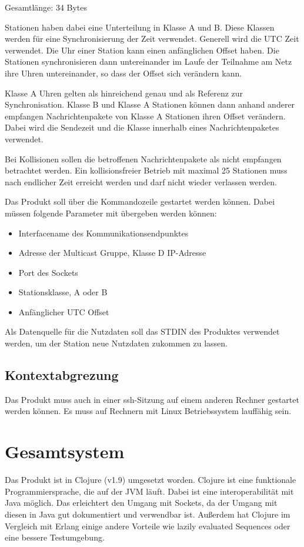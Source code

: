 \documentclass[draft=false
              ,paper=a4
              ,twoside=false
              ,fontsize=11pt
              ,headsepline
              ,BCOR10mm
              ,DIV11
              ]{scrbook}
\begin{document}
Gesamtlänge: 34 Bytes

Stationen haben dabei eine Unterteilung in Klasse A und B. Diese Klassen werden für eine Synchronisierung der Zeit verwendet. Generell wird die UTC Zeit verwendet. Die Uhr einer Station kann einen anfänglichen Offset haben. Die Stationen synchronisieren dann untereinander im Laufe der Teilnahme am Netz ihre Uhren untereinander, so dass der Offset sich verändern kann.

Klasse A Uhren gelten als hinreichend genau und als Referenz zur Synchronisation. Klasse B und Klasse A Stationen können dann anhand anderer empfangen Nachrichtenpakete von Klasse A Stationen ihren Offset verändern. Dabei wird die Sendezeit und die Klasse innerhalb eines Nachrichtenpaketes verwendet.

Bei Kollisionen sollen die betroffenen Nachrichtenpakete als nicht empfangen betrachtet werden. Ein kollisionsfreier Betrieb mit maximal 25 Stationen muss nach endlicher Zeit erreicht werden und darf nicht wieder verlassen werden.

Das Produkt soll über die Kommandozeile gestartet werden können. Dabei müssen folgende Parameter mit übergeben werden können:
\begin{itemize}
	\item Interfacename des Kommunikationsendpunktes
	\item Adresse der Multicast Gruppe, Klasse D IP-Adresse
	\item Port des Sockets
	\item Stationsklasse, A oder B
	\item Anfänglicher UTC Offset
\end{itemize}
Als Datenquelle für die Nutzdaten soll das STDIN des Produktes verwendet werden, um der Station neue Nutzdaten zukommen zu lassen.

\section{Kontextabgrezung}
Das Produkt muss auch in einer ssh-Sitzung auf einem anderen Rechner gestartet werden können. Es muss auf Rechnern mit Linux Betriebssystem lauffähig sein.

\chapter{Gesamtsystem}
Das Produkt ist in Clojure (v1.9) umgesetzt worden. Clojure ist eine funktionale Programmiersprache, die auf der JVM läuft. Dabei ist eine interoperabilität mit Java möglich. Das erleichtert den Umgang mit Sockets, da der Umgang mit diesen in Java gut dokumentiert und verwendbar ist. Außerdem hat Clojure im Vergleich mit Erlang einige andere Vorteile wie lazily evaluated Sequences oder eine bessere Testumgebung.
\end{document}
